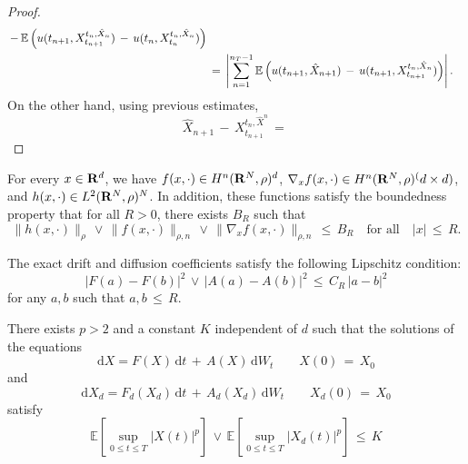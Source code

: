 \begin{proof}
\begin{equation*}
\begin{aligned}
{            \,-\,\mathbb E\left(u(t_{n+1}, X^{t_{n},\hat X_n}_{t_{n+1}})
                \,-\,u(t_n,X^{t_n,\hat X_n}_{t_n})\right) } \\
        & \,=\, \left|  \sum_{n=1}^{n_T-1} \mathbb E \left( u(t_{n+1}, \hat
                X_{n+1}) \,-\, u(t_{n+1}, X^{t_{n},\hat X_n}_{t_{n+1}}) \right)  \right|.
        \end{aligned}
    \end{equation*}
    On the other hand, using previous estimates,
    \begin{equation*}
        \hat X_{n+1} \,-\, X^{t_n,\hat X^n}_{t_{n+1}} \,=\,  
    \end{equation*}
    


\end{proof}



\begin{assumption}
    For every $x \in \mathbf R^d$, we have $f(x,\cdot)\in H^n(\mathbf R^N, \rho)^d$, $\nabla_x f(x,\cdot) \in H^n(\mathbf R^N, \rho)^(d\times d)$, and $h(x,\cdot) \in L^2(\mathbf R^N, \rho)^N$. In addition, these functions satisfy the 
    boundedness property that for all $R>0$, there exists $B_R$ such that
    $$
    \|h(x,\cdot)\|_{\rho}\,{\vee}\,
    \|f(x,\cdot)\|_{{\rho},n}\,{\vee}\,\|\nabla_x f(x,\cdot)\|_{{\rho},n}
    \,{\leq}\, B_R \quad \text{for all} \quad |x| \,{\leq}\,R.
    $$
\end{assumption}
\begin{assumption}
    The exact drift and diffusion coefficients satisfy the following
    Lipschitz condition:
    $$ 
    \left|F(a)-F(b)\right|^2\,{\vee}\,\left|A(a)-A(b)\right|^2\, {\leq} \,C_R\, |a-b|^2
    $$
    for any $a,b$ such that $a,b\, {\leq} \,R$.
    \label{assumption Lipshitz}
\end{assumption}
\begin{assumption}
    There exists $p>2$ and a constant $K$ independent of $d$ such that the solutions of the equations 
    $$
    \mathrm dX=F(X)\,\mathrm dt\,+\,A(X)\,\mathrm dW_t \quad \quad X(0) \,=\,X_0
    $$
    and 
    $$
    \mathrm dX_d=F_d(X_d)\,\mathrm dt\,+\,A_d(X_d)\,\mathrm dW_t  \quad \quad X_d(0) \,=\,X_0 
    $$
    satisfy
    $$
    \mathbb E\left[\sup_{0 {\leq} t  {\leq} T} |X(t)|^p\right]\,{\vee}\,\mathbb
    E\left[\sup_{0 {\leq} t  {\leq} T} |X_d(t)|^p\right] \, {\leq} \,K
    $$
    \label{assumption: bounded moments}
\end{assumption} 
